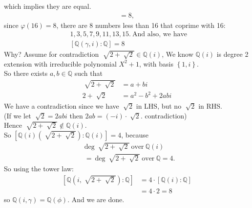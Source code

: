 \documentclass{article}
\begin{document}
\begin{homeworkProblem}
    which implies they are equal.\\
    \begin{align}
        [\mathbb{Q}(\phi):\mathbb{Q}] = 8,
    \end{align}
    since $\varphi(16)=8$, there are 8 numbers less than 16 that
    coprime with 16:
    \begin{align}
        &1,3,5,7,9,11,13,15. \ \text{And also, we have }\\
        &[\mathbb{Q}(\gamma,i):\mathbb{Q}]=8
    \end{align}
    Why? Assume for contradiction $\sqrt[]{2 + \sqrt[]{2}} \in \mathbb{Q}(i)$,
    We know $\mathbb{Q}(i)$ is degree 2 extension with irreducible polynomial 
    $X^2 + 1$, with basis $\left\{ 1, i \right\}$.\\
    So there exists $a,b \in \mathbb{Q}$ such that
    \begin{align}
        \sqrt[]{2+\sqrt[]{2}} &= a + bi\\
        2 + \sqrt[]{2} &= a^2 - b^2 + 2abi
    \end{align}
    We have a contradiction since we have $\sqrt[]{2}$ in LHS,
    but no $\sqrt[]{2}$ in RHS.\\
    (If we let $\sqrt[]{2}=2abi$ then $2ab = (-i)\cdot \sqrt[]{2}$. contradiction)\\
    Hence $\sqrt[]{2+\sqrt[]{2}} \not\in \mathbb{Q}(i)$.\\ 
    So $[\mathbb{Q}(i)(\sqrt[]{2+\sqrt[]{2}}): \mathbb{Q}(i)] = 4$, 
    because 
    \begin{align}
        &\text{deg} \ \sqrt[]{2 + \sqrt[]{2}} \ \text{over} \ \mathbb{Q}(i) \\
        &= \ \text{deg} \ \sqrt[]{2+\sqrt[]{2}} \ \text{over} \ \mathbb{Q} 
        = 4.
    \end{align}
    So using the tower law:
    \begin{align}
        \left[ \mathbb{Q}\left( i, \sqrt[]{2 + \sqrt[]{2}} \right) : \mathbb{Q} \right] 
        &= 4 \cdot \left[ \mathbb{Q}(i) : \mathbb{Q} \right]\\
        &= 4 \cdot 2 = 8
    \end{align}
    so $\mathbb{Q}(i, \gamma) = \mathbb{Q}(\phi)$. And we are done.




\end{homeworkProblem}

\pagebreak
\end{document}
